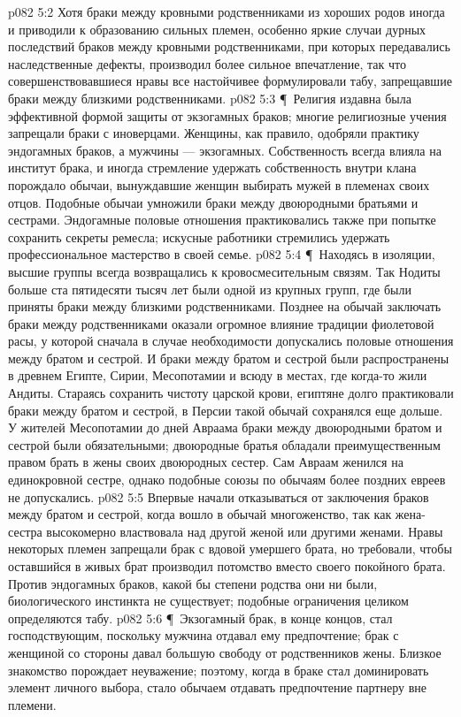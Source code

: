 \vs p082 5:2 Хотя браки между кровными родственниками из хороших родов иногда и приводили к образованию сильных племен, особенно яркие случаи дурных последствий браков между кровными родственниками, при которых передавались наследственные дефекты, производил более сильное впечатление, так что совершенствовавшиеся нравы все настойчивее формулировали табу, запрещавшие браки между близкими родственниками.
\vs p082 5:3 \P\ Религия издавна была эффективной формой защиты от экзогамных браков; многие религиозные учения запрещали браки с иноверцами. Женщины, как правило, одобряли практику эндогамных браков, а мужчины --- экзогамных. Собственность всегда влияла на институт брака, и иногда стремление удержать собственность внутри клана порождало обычаи, вынуждавшие женщин выбирать мужей в племенах своих отцов. Подобные обычаи умножили браки между двоюродными братьями и сестрами. Эндогамные половые отношения практиковались также при попытке сохранить секреты ремесла; искусные работники стремились удержать профессиональное мастерство в своей семье.
\vs p082 5:4 \P\ Находясь в изоляции, высшие группы всегда возвращались к кровосмесительным связям. Так Нодиты больше ста пятидесяти тысяч лет были одной из крупных групп, где были приняты браки между близкими родственниками. Позднее на обычай заключать браки между родственниками оказали огромное влияние традиции фиолетовой расы, у которой сначала в случае необходимости допускались половые отношения между братом и сестрой. И браки между братом и сестрой были распространены в древнем Египте, Сирии, Месопотамии и всюду в местах, где когда\hyp{}то жили Андиты. Стараясь сохранить чистоту царской крови, египтяне долго практиковали браки между братом и сестрой, в Персии такой обычай сохранялся еще дольше. У жителей Месопотамии до дней Авраама браки между двоюродными братом и сестрой были обязательными; двоюродные братья обладали преимущественным правом брать в жены своих двоюродных сестер. Сам Авраам женился на единокровной сестре, однако подобные союзы по обычаям более поздних евреев не допускались.
\vs p082 5:5 Впервые начали отказываться от заключения браков между братом и сестрой, когда вошло в обычай многоженство, так как жена\hyp{}сестра высокомерно властвовала над другой женой или другими женами. Нравы некоторых племен запрещали брак с вдовой умершего брата, но требовали, чтобы оставшийся в живых брат производил потомство вместо своего покойного брата. Против эндогамных браков, какой бы степени родства они ни были, биологического инстинкта не существует; подобные ограничения целиком определяются табу.
\vs p082 5:6 \P\ Экзогамный брак, в конце концов, стал господствующим, поскольку мужчина отдавал ему предпочтение; брак с женщиной со стороны давал большую свободу от родственников жены. Близкое знакомство порождает неуважение; поэтому, когда в браке стал доминировать элемент личного выбора, стало обычаем отдавать предпочтение партнеру вне племени.
